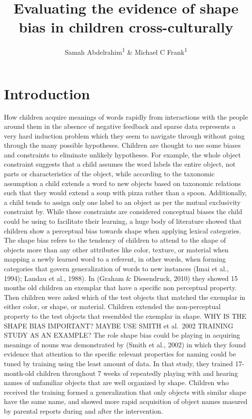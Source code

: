 \documentclass[
  man]{apa6}
\title{Evaluating the evidence of shape bias in children cross-culturally}
\author{Samah Abdelrahim\textsuperscript{1} \& Michael C Frank\textsuperscript{1}}
\date{}
\affiliation{\vspace{0.5cm}\textsuperscript{1} Stanford University}
\begin{document}
\maketitle

\hypertarget{introduction}{%
\section{Introduction}\label{introduction}}

How children acquire meanings of words rapidly from interactions with the people around them in the absence of negative feedback and sparse data represents a very hard induction problem which they seem to navigate through without going through the many possible hypotheses. Children are thought to use some biases and constraints to eliminate unlikely hypotheses. For example, the whole object constraint suggests that a child assumes the word labels the entire object, not parts or characteristics of the object, while according to the taxonomic assumption a child extends a word to new objects based on taxonomic relations such that they would extend a soup with pizza rather than a spoon. Additionally, a child tends to assign only one label to an object as per the mutual exclusivity constraint by. While these constraints are considered conceptual biases the child could be using to facilitate their learning, a huge body of literature showed that children show a perceptual bias towards shape when applying lexical categories.
The shape bias refers to the tendency of children to attend to the shape of objects more than any other attributes like color, texture, or material when mapping a newly learned word to a referent, in other words, when forming categories that govern generalization of words to new instances (Imai et al., 1994); Landau et al., 1988). In (Graham \& Diesendruck, 2010) they showed 15 months old children an exemplar that have a specific non perceptual property. Then children were asked which of the test objects that matched the exemplar in either color, or shape, or material. Children extended the non-perceptual property to the test objects that resembled the exemplar in shape.
WHY IS THE SHAPE BIAS IMPORTANT? MAYBE USE SMITH et al.~2002 TRAINING STUDY AS AN EXAMPLE?
The role shape bias could be playing in acquiring meanings of nouns was demonstrated by (Smith et al., 2002) in which they found evidence that attention to the specific relevant properties for naming could be tuned by training using the least amount of data. In that study, they trained 17-month-old children throughout 7 weeks of repeatedly playing with and hearing names of unfamiliar objects that are well organized by shape. Children who received the training formed a generalization that only objects with similar shape have the same name, and showed more rapid acquisition of object names masured by parental reports during and after the intervention.
\end{document}
